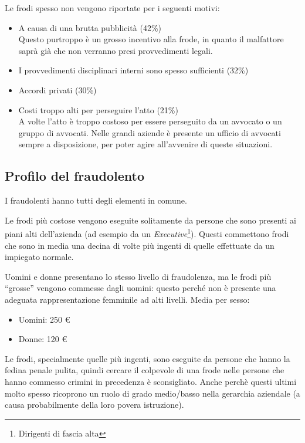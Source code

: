 Le frodi spesso non vengono riportate per i seguenti motivi:
\begin{itemize}
  \item A causa di una brutta pubblicità (42\%) \\
  Questo purtroppo è un grosso incentivo alla frode, in quanto il malfattore
  saprà già che non verranno presi provvedimenti legali.
  \item I provvedimenti disciplinari interni sono spesso sufficienti (32\%)
  \item Accordi privati (30\%)
  \item Costi troppo alti per perseguire l'atto (21\%) \\
  A volte l'atto è troppo costoso per essere perseguito da un avvocato o un
  gruppo di avvocati. Nelle grandi aziende è presente un ufficio di avvocati
  sempre a disposizione, per poter agire all'avvenire di queste situazioni.
\end{itemize}

\subsection{Profilo del fraudolento}

I fraudolenti hanno tutti degli elementi in comune.

Le frodi più costose vengono eseguite solitamente da persone che sono presenti
ai piani alti dell'azienda (ad esempio da un 
\textit{Executive}\footnote{Dirigenti di
fascia alta}). Questi commettono frodi che sono in media una decina di volte
più ingenti di quelle effettuate da un impiegato normale.

Uomini e donne presentano lo stesso livello di fraudolenza, ma le frodi più
``grosse'' vengono commesse dagli uomini: questo perché non è presente una
adeguata rappresentazione femminile ad alti livelli.
Media per sesso:
\begin{itemize}
  \item Uomini: 250 \euro
  \item Donne: 120 \euro
\end{itemize}

Le frodi, specialmente quelle più ingenti, sono eseguite da persone che hanno la fedina
penale pulita, quindi cercare il colpevole di una frode nelle persone che hanno commesso
 crimini in precedenza è sconsigliato. Anche perchè questi ultimi molto spesso ricoprono 
un ruolo di grado medio/basso nella gerarchia aziendale (a causa probabilmente della 
loro povera istruzione).

